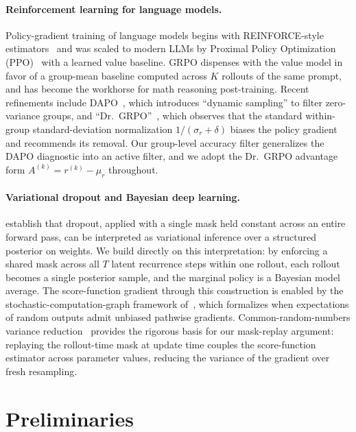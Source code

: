 \documentclass[11pt]{article}
\theoremstyle{definition}
\theoremstyle{remark}
\begin{document}
\paragraph{Reinforcement learning for language models.}
Policy-gradient training of language models begins with
REINFORCE-style estimators~\citep{williams1992reinforce} and was
scaled to modern LLMs by Proximal Policy Optimization
(PPO)~\citep{schulman2017ppo} with a learned value baseline.  GRPO
\citep{shao2024deepseekmath} dispenses with the value model in favor
of a group-mean baseline computed across $K$ rollouts of the same
prompt, and has become the workhorse for math reasoning post-training.
Recent refinements include \textsc{DAPO}~\citep{yu2024dapo}, which
introduces ``dynamic sampling'' to filter zero-variance groups, and
``Dr.\ GRPO''~\citep{liu2024drgrpo}, which observes that the standard
within-group standard-deviation normalization
$1/(\sigma_r + \delta)$ biases the policy gradient and recommends its
removal.  Our group-level accuracy filter generalizes the DAPO
diagnostic into an active filter, and we adopt the Dr.\ GRPO advantage
form $A^{(k)} = r^{(k)} - \mu_r$ throughout.

\paragraph{Variational dropout and Bayesian deep learning.}
\citet{gal2016dropout} establish that dropout, applied with a single
mask held constant across an entire forward pass, can be interpreted
as variational inference over a structured posterior on weights.  We
build directly on this interpretation: by enforcing a shared mask
across all $T$ latent recurrence steps within one rollout, each
rollout becomes a single posterior sample, and the marginal policy is
a Bayesian model average.  The score-function gradient through this
construction is enabled by the stochastic-computation-graph framework
of~\citet{schulman2015scg}, which formalizes when expectations of
random outputs admit unbiased pathwise gradients.  Common-random-numbers
variance reduction~\citep{glasserman1992crn} provides the rigorous
basis for our mask-replay argument: replaying the rollout-time mask at
update time couples the score-function estimator across parameter
values, reducing the variance of the gradient over fresh resampling.

\section{Preliminaries}
\label{sec:prelim}
\end{document}
